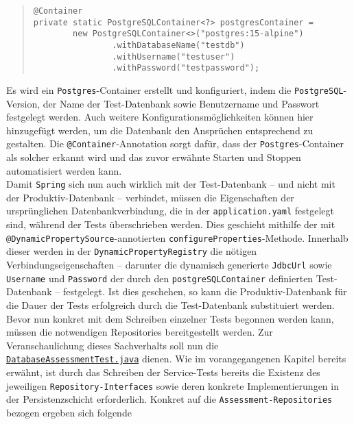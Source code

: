 \begin{quote}
\begin{verbatim}
@Container
private static PostgreSQLContainer<?> postgresContainer = 
        new PostgreSQLContainer<>("postgres:15-alpine")
                .withDatabaseName("testdb")
                .withUsername("testuser")
                .withPassword("testpassword");
\end{verbatim}
\end{quote}

Es wird ein \texttt{Postgres}-Container erstellt und konfiguriert, indem die 
\texttt{PostgreSQL}-Version, der Name der Test-Datenbank sowie Benutzername und 
Passwort festgelegt werden. Auch weitere Konfigurationsmöglichkeiten können hier 
hinzugefügt werden, um die Datenbank den Ansprüchen entsprechend zu gestalten. Die 
\texttt{@Container}-Annotation sorgt dafür, dass der \texttt{Postgres}-Container 
als solcher erkannt wird und das zuvor erwähnte Starten und Stoppen automatisiert 
werden kann. \\ 
Damit \texttt{Spring} sich nun auch wirklich mit der Test-Datenbank -- und nicht mit 
der Produktiv-Datenbank -- verbindet, müssen die Eigenschaften der ursprünglichen 
Datenbankverbindung, die in der \texttt{application.yaml} festgelegt sind, während 
der Tests überschrieben werden. Dies geschieht mithilfe der mit 
\texttt{@DynamicPropertySource}-annotierten \texttt{configureProperties}-Methode. 
Innerhalb dieser werden in der \texttt{DynamicPropertyRegistry} die nötigen 
Verbindungseigenschaften -- darunter die dynamisch generierte \texttt{JdbcUrl} sowie 
\texttt{Username} und \texttt{Password} der durch den \texttt{postgreSQLContainer} 
definierten Test-Datenbank -- festgelegt. Ist dies geschehen, so kann die 
Produktiv-Datenbank für die Dauer der Tests erfolgreich durch die Test-Datenbank 
substituiert werden. \\ 
Bevor nun konkret mit dem Schreiben einzelner Tests begonnen werden kann, müssen 
die notwendigen Repositories bereitgestellt werden. Zur Veranschaulichung dieses 
Sachverhalts soll nun die 
\href{https://github.com/FlorianOhmes/bat_spielzeitenplaner/blob/main/spielzeitenplaner/src/test/java/de/bathesis/spielzeitenplaner/database/DatabaseAssessmentTest.java}{\texttt{DatabaseAssessmentTest.java}}
dienen. Wie im vorangegangenen Kapitel bereits erwähnt, ist durch das Schreiben der 
Service-Tests bereits die Existenz des jeweiligen \texttt{Repository-Interfaces} 
sowie deren konkrete Implementierungen in der Persistenzschicht erforderlich. 
Konkret auf die \texttt{Assessment-Repositories} bezogen ergeben sich folgende 
